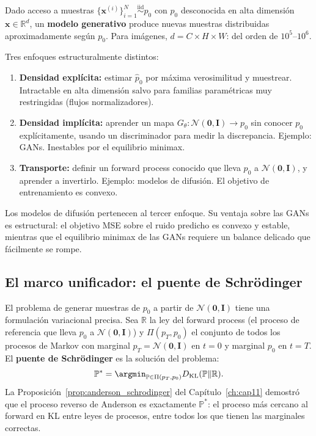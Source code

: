 Dado acceso a muestras $\{\bm{x}^{(i)}\}_{i=1}^N \overset{\mathrm{iid}}{\sim}
p_0$ con $p_0$ desconocida en alta dimensión $\bm{x}\in\mathbb{R}^d$, un
\textbf{modelo generativo} produce nuevas muestras distribuidas aproximadamente
según $p_0$. Para imágenes, $d = C\times H\times W$: del orden de $10^5$--$10^6$.

Tres enfoques estructuralmente distintos:

\begin{enumerate}
  \item \textbf{Densidad explícita:} estimar $\hat{p}_0$ por máxima
        verosimilitud y muestrear. Intractable en alta dimensión salvo para
        familias paramétricas muy restringidas (flujos normalizadores).
  \item \textbf{Densidad implícita:} aprender un mapa $G_\theta:\mathcal{N}(\bm{0},\bm{I})
        \to p_0$ sin conocer $p_0$ explícitamente, usando un discriminador para
        medir la discrepancia. Ejemplo: GANs. Inestables por el equilibrio
        minimax.
  \item \textbf{Transporte:} definir un forward process conocido que lleva $p_0$
        a $\mathcal{N}(\bm{0},\bm{I})$, y aprender a invertirlo. Ejemplo:
        modelos de difusión. El objetivo de entrenamiento es convexo.
\end{enumerate}

Los modelos de difusión pertenecen al tercer enfoque. Su ventaja sobre las GANs
es estructural: el objetivo MSE sobre el ruido predicho es convexo y estable,
mientras que el equilibrio minimax de las GANs requiere un balance delicado que
fácilmente se rompe.

\subsection{El marco unificador: el puente de Schrödinger}
\label{subsec:marco_unificador}

El problema de generar muestras de $p_0$ a partir de $\mathcal{N}(\bm{0},\bm{I})$
tiene una formulación variacional precisa. Sea $\mathbb{R}$ la ley del forward
process (el proceso de referencia que lleva $p_0$ a $\mathcal{N}(\bm{0},\bm{I})$)
y $\Pi(p_T, p_0)$ el conjunto de todos los procesos de Markov con marginal
$p_T = \mathcal{N}(\bm{0},\bm{I})$ en $t=0$ y marginal $p_0$ en $t=T$.
El \textbf{puente de Schrödinger} es la solución del problema:
\[
  \mathbb{P}^* = \argmin_{\mathbb{P}\in\Pi(p_T,p_0)}
  D_{\mathrm{KL}}(\mathbb{P}\|\mathbb{R}).
\]
La Proposición~\ref{prop:anderson_schrodinger} del
Capítulo~\ref{ch:cap11} demostró que el proceso reverso de Anderson
es exactamente $\mathbb{P}^*$: el proceso más cercano al forward en KL
entre leyes de procesos, entre todos los que tienen las marginales correctas.

